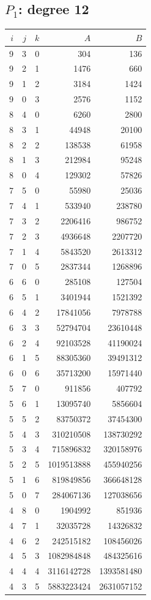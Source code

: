 \subsection{\texorpdfstring{$P_1$}{P1}: degree 12}
\begin{longtable}{rrr|rr}
$i$&$j$&$k$&$A$&$B$\\\hline\endhead
9&3&0&304&136\\
9&2&1&1476&660\\
9&1&2&3184&1424\\
9&0&3&2576&1152\\
8&4&0&6260&2800\\
8&3&1&44948&20100\\
8&2&2&138538&61958\\
8&1&3&212984&95248\\
8&0&4&129302&57826\\
7&5&0&55980&25036\\
7&4&1&533940&238780\\
7&3&2&2206416&986752\\
7&2&3&4936648&2207720\\
7&1&4&5843520&2613312\\
7&0&5&2837344&1268896\\
6&6&0&285108&127504\\
6&5&1&3401944&1521392\\
6&4&2&17841056&7978788\\
6&3&3&52794704&23610448\\
6&2&4&92103528&41190024\\
6&1&5&88305360&39491312\\
6&0&6&35713200&15971440\\
5&7&0&911856&407792\\
5&6&1&13095740&5856604\\
5&5&2&83750372&37454300\\
5&4&3&310210508&138730292\\
5&3&4&715896832&320158976\\
5&2&5&1019513888&455940256\\
5&1&6&819849856&366648128\\
5&0&7&284067136&127038656\\
4&8&0&1904992&851936\\
4&7&1&32035728&14326832\\
4&6&2&242515182&108456026\\
4&5&3&1082984848&484325616\\
4&4&4&3116142728&1393581480\\
4&3&5&5883223424&2631057152\\

\end{longtable}
